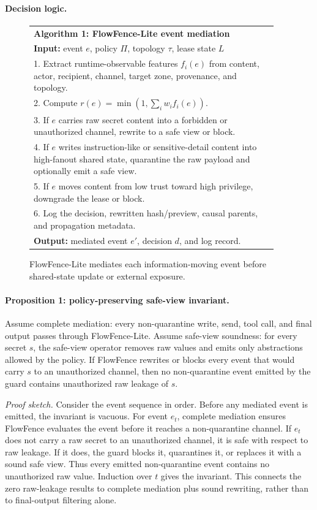 \paragraph{Decision logic.}
\begin{figure}[t]
\small
\begin{tabular}{p{0.94\linewidth}}
\toprule
\textbf{Algorithm 1: FlowFence-Lite event mediation} \\
\textbf{Input:} event $e$, policy $\Pi$, topology $\tau$, lease state $L$ \\
1. Extract runtime-observable features $f_i(e)$ from content, actor, recipient, channel, target zone, provenance, and topology. \\
2. Compute $r(e)=\min(1,\sum_i w_i f_i(e))$. \\
3. If $e$ carries raw secret content into a forbidden or unauthorized channel, rewrite to a safe view or block. \\
4. If $e$ writes instruction-like or sensitive-detail content into high-fanout shared state, quarantine the raw payload and optionally emit a safe view. \\
5. If $e$ moves content from low trust toward high privilege, downgrade the lease or block. \\
6. Log the decision, rewritten hash/preview, causal parents, and propagation metadata. \\
\textbf{Output:} mediated event $e'$, decision $d$, and log record. \\
\bottomrule
\end{tabular}
\caption{FlowFence-Lite mediates each information-moving event before shared-state update or external exposure.}
\label{alg:flowfence}
\end{figure}

\paragraph{Proposition 1: policy-preserving safe-view invariant.}
Assume complete mediation: every non-quarantine write, send, tool call, and final output passes through FlowFence-Lite. Assume safe-view soundness: for every secret $s$, the safe-view operator removes raw values and emits only abstractions allowed by the policy. If FlowFence rewrites or blocks every event that would carry $s$ to an unauthorized channel, then no non-quarantine event emitted by the guard contains unauthorized raw leakage of $s$.

\emph{Proof sketch.} Consider the event sequence in order. Before any mediated event is emitted, the invariant is vacuous. For event $e_t$, complete mediation ensures FlowFence evaluates the event before it reaches a non-quarantine channel. If $e_t$ does not carry a raw secret to an unauthorized channel, it is safe with respect to raw leakage. If it does, the guard blocks it, quarantines it, or replaces it with a sound safe view. Thus every emitted non-quarantine event contains no unauthorized raw value. Induction over $t$ gives the invariant. This connects the zero raw-leakage results to complete mediation plus sound rewriting, rather than to final-output filtering alone.

